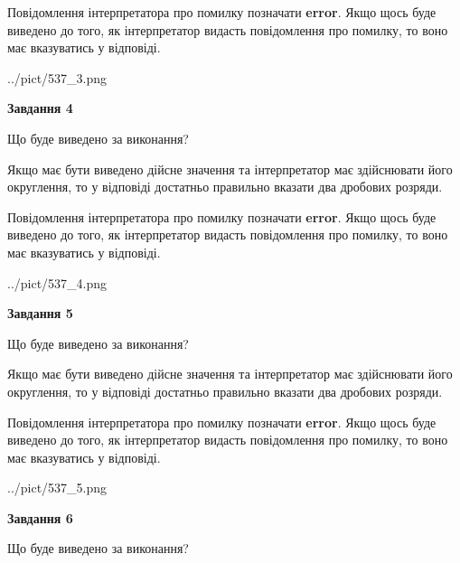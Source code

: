 \documentclass[12pt, ukrainian]{article}
\begin{document}
{\begin {Large}
Повідомлення інтерпретатора про помилку позначати \textbf{error}.
Якщо щось буде виведено до того, як інтерпретатор видасть повідомлення про помилку, 
то воно має вказуватись у відповіді. \par

\begin{center}
	{../pict/537_3.png}
\end{center}
\newpage

{\begin {center}\textbf{Завдання 4}\end {center}}\par
Що буде виведено за виконання? \par

Якщо має бути виведено дійсне значення та інтерпретатор має здійснювати його округлення, 
то у відповіді достатньо правильно вказати два дробових розряди.

Повідомлення інтерпретатора про помилку позначати \textbf{error}.
Якщо щось буде виведено до того, як інтерпретатор видасть повідомлення про помилку, 
то воно має вказуватись у відповіді. \par

\begin{center}
	{../pict/537_4.png}
\end{center}
\newpage

{\begin {center}\textbf{Завдання 5}\end {center}}\par
Що буде виведено за виконання? \par

Якщо має бути виведено дійсне значення та інтерпретатор має здійснювати його округлення, 
то у відповіді достатньо правильно вказати два дробових розряди.

Повідомлення інтерпретатора про помилку позначати \textbf{error}.
Якщо щось буде виведено до того, як інтерпретатор видасть повідомлення про помилку, 
то воно має вказуватись у відповіді. \par

\begin{center}
	{../pict/537_5.png}
\end{center}
\newpage

{\begin {center}\textbf{Завдання 6}\end {center}}\par
Що буде виведено за виконання? \par


\end{Large}}
\end{document}

